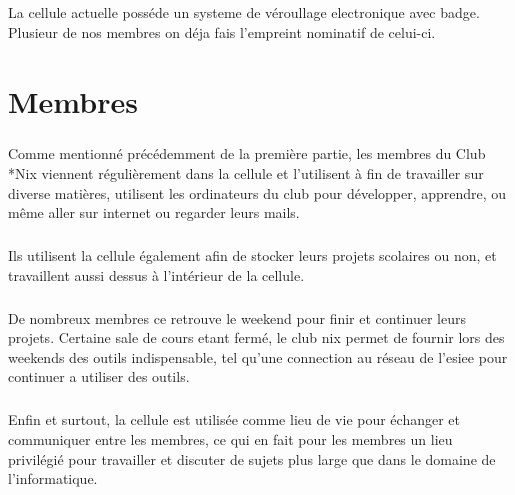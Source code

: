 \documentclass[11pt]{report}
\begin{document}
\paragraph{} La cellule actuelle posséde un systeme de véroullage electronique avec badge. Plusieur de nos membres on déja fais l'empreint nominatif de celui-ci.

\chapter{Membres}

\paragraph{} Comme mentionné précédemment de la première partie, les membres du
Club *Nix viennent régulièrement dans la cellule et l'utilisent à fin de
travailler sur diverse matières, utilisent les ordinateurs du club pour
développer, apprendre, ou même aller sur internet ou regarder leurs mails.

\paragraph{} Ils utilisent la cellule également afin de stocker leurs projets
scolaires ou non, et travaillent aussi dessus à l'intérieur de la cellule.

\paragraph{} De nombreux membres ce retrouve le weekend pour finir et continuer leurs projets. Certaine sale de cours etant fermé, le club nix permet de fournir lors des weekends des outils indispensable, tel qu'une connection au réseau de l'esiee pour continuer a utiliser des outils.


\paragraph{} Enfin et surtout, la cellule est utilisée comme lieu de vie pour
échanger et communiquer entre les membres, ce qui en fait pour les membres un
lieu privilégié pour travailler et discuter de sujets plus large que dans le
domaine de l'informatique.
\end{document}
